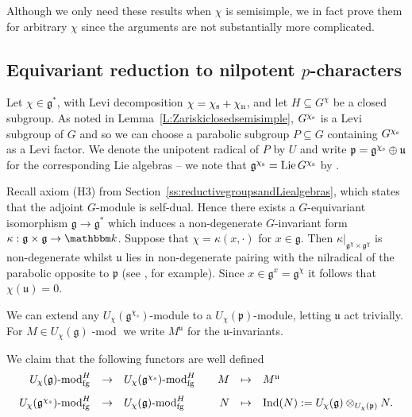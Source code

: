 \documentclass[twoside,12pt,reqno]{amsart}
\theoremstyle{remark}
\numberwithin{equation}{section}
\def\k{{\mathbbm k}}
\def\rn{{\mathrm n}}
\def\rs{{\mathrm s}}
\def\lmod{\!\operatorname{-mod}}
\def\Lie{\operatorname{Lie}}
\def\Ind{\operatorname{Ind}}
\def\g{{\mathfrak g}}
\def\p{\mathfrak p}
\def\u{\mathfrak{u}}
\newcommand{\fg}{\operatorname{fg}}
\renewcommand{\rs}{{\rm s}}
\renewcommand{\rn}{{\rm n}}
\begin{document}
Although we only need these results when $\chi$ is semisimple, we in fact prove them for arbitrary $\chi$ since the arguments are not substantially more complicated.

\subsection{Equivariant reduction to nilpotent $p$-characters}
\label{ss:equivariantreductiontonilpotent}

Let $\chi \in \g^*$, with Levi decomposition $\chi = \chi_\rs + \chi_\rn$, and let $H \subseteq G^\chi$ be a closed subgroup. As noted in Lemma~\ref{L:Zariskiclosedsemisimple}, $G^{\chi_\rs}$ is a Levi subgroup of $G$ and so we can choose a parabolic subgroup $P \subseteq G$ containing $G^{\chi_\rs}$ as a Levi factor. We denote the unipotent radical of $P$ by $U$ and write $\p = \g^{\chi_\rs} \oplus \u$ for the corresponding Lie algebras -- we note that $\g^{\chi_\rs} = \Lie G^{\chi_\rs}$ by \cite[2.2(4)]{JaNO}.

Recall axiom (H3) from Section~\ref{ss:reductivegroupsandLiealgebras}, which states that the adjoint $G$-module is self-dual. Hence there exists a $G$-equivariant isomorphism $\g \to \g^*$ which induces a non-degenerate $G$-invariant form $\kappa : \g \times \g \to \k$. Suppose that $\chi = \kappa(x, \cdot)$ for $x\in \g$. Then $\kappa|_{\g^\chi \times\g^\chi}$ is non-degenerate whilst $\u$ lies in non-degenerate pairing with the nilradical of the parabolic opposite to $\p$ (see \cite[6.6]{JaLA}, for example). Since $x\in \g^x = \g^\chi$ it follows that $\chi(\mathfrak{u}) = 0$.

We can extend any $U_\chi(\g^{\chi_s})$-module to a $U_\chi(\mathfrak{p})$-module, letting $\u$ act trivially. For $M \in U_\chi(\g)\lmod$ we write $M^\u$ for the $\u$-invariants.

We claim that the following functors are well defined
\begin{equation} \label{eq: FP equivalence 1 H}
    \begin{array}{rclcrcl}
    U_\chi(\g)\lmod_{\fg}^H & \to & U_\chi(\g^{\chi_s})\lmod_{\fg}^H & & M & \mapsto &M^{\u}\vspace{8pt} \\
    U_\chi(\g^{\chi_s})\lmod_{\fg}^H & \to & U_\chi(\g)\lmod_{\fg}^H & &  N & \mapsto & \Ind(N) := U_\chi(\g) \otimes_{U_\chi(\mathfrak{p})} N.
    \end{array}
\end{equation}
\end{document}
